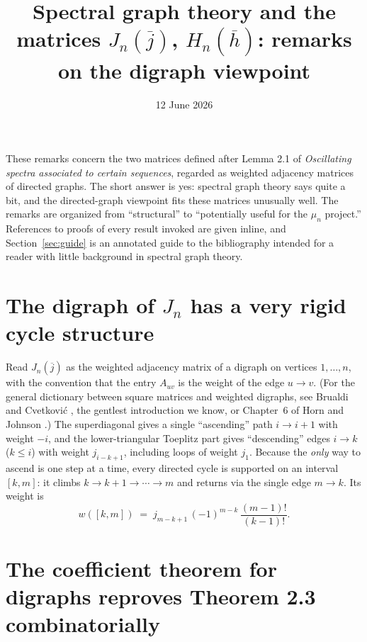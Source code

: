 \documentclass[11pt, fleqn]{amsart}
\title{Spectral graph theory and the matrices $J_n(\overline{j})$, $H_n(\overline{h})$:
remarks on the digraph viewpoint}
\date{12 June 2026}
\theoremstyle{remark}
\begin{document}
\maketitle

\noindent
These remarks concern the two matrices defined after Lemma 2.1 of
\emph{Oscillating spectra associated to certain sequences}, regarded as
weighted adjacency matrices of directed graphs. The short answer is yes:
spectral graph theory says quite a bit, and the directed-graph viewpoint
fits these matrices unusually well. The remarks are organized from
``structural'' to ``potentially useful for the $\mu_n$ project.''
References to proofs of every result invoked are given inline, and
Section~\ref{sec:guide} is an annotated guide to the bibliography
intended for a reader with little background in spectral graph theory.

\section{The digraph of $J_n$ has a very rigid cycle structure}

Read $J_n(\overline{j})$ as the weighted adjacency matrix of a digraph on
vertices $1,\dots,n$, with the convention that the entry $A_{uv}$ is the
weight of the edge $u\to v$. (For the general dictionary between square
matrices and weighted digraphs, see Brualdi and Cvetkovi\'c
\cite{BC09}, the gentlest introduction we know, or Chapter~6 of Horn
and Johnson \cite{HJ13}.) The superdiagonal gives a single
``ascending'' path $i \to i+1$ with weight $-i$, and the lower-triangular
Toeplitz part gives ``descending'' edges $i \to k$ ($k \le i$) with weight
$j_{i-k+1}$, including loops of weight $j_1$. Because the \emph{only} way
to ascend is one step at a time, every directed cycle is supported on an
interval $[k,m]$: it climbs $k \to k+1 \to \cdots \to m$ and returns via
the single edge $m \to k$. Its weight is
\begin{equation}\label{eq:cycleweight}
w([k,m]) \;=\; j_{m-k+1}\,(-1)^{m-k}\,\frac{(m-1)!}{(k-1)!}.
\end{equation}

\section{The coefficient theorem for digraphs reproves Theorem 2.3
combinatorially}
\end{document}
